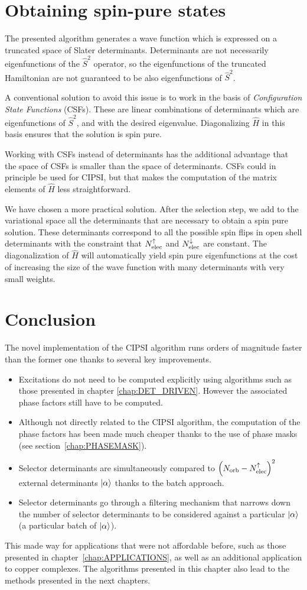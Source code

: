 \documentclass[./thesis.tex]{subfiles}
\begin{document}
\section{Obtaining spin-pure states}
\label{sec:cipsi_s2}

The presented algorithm generates a wave function which is expressed on a truncated space of Slater determinants. Determinants are not necessarily eigenfunctions of the $\widehat S^2$ operator, so the eigenfunctions of the truncated Hamiltonian are not guaranteed to be also eigenfunctions of $\widehat S^2$.

A conventional solution to avoid this issue is to work in the basis of \emph{Configuration State Functions} (CSFs). These are linear combinations of determinants which are eigenfunctions of $\widehat S^2$, and with the desired eigenvalue. Diagonalizing $\widehat H$ in this basis ensures that the solution is spin pure.

Working with CSFs instead of determinants has the additional advantage that the space of CSFs is smaller than the space of determinants. CSFs could in principle be used for CIPSI, but that makes the computation of the matrix elements of $\widehat H$ less straightforward.

We have chosen a more practical solution.\cite{Bytautas_2009} After the selection step, we add to the variational space all the determinants that are necessary to obtain a spin pure solution. These determinants correspond to all the possible spin flips in open shell determinants with the constraint that ${N_\text{elec}^{\uparrow}}$ and ${N_\text{elec}^{\downarrow}}$ are constant. The diagonalization of $\widehat H$ will automatically yield spin pure eigenfunctions at the cost of increasing the size of the wave function with many determinants with very small weights.

\section{Conclusion}

The novel implementation of the CIPSI algorithm runs orders of magnitude faster than the former one thanks to several key improvements.
\begin{itemize}
\item
Excitations do not need to be computed explicitly using algorithms such as those presented in chapter \ref{chap:DET_DRIVEN}. However the associated phase factors still have to be computed.
\item
Although not directly related to the CIPSI algorithm, the computation of the phase factors has been made much cheaper thanks to the use of phase masks (see section~\ref{chap:PHASEMASK}).
\item
Selector determinants are simultaneously compared to $\qty({N_\text{orb}}-{N_\text{elec}^{\uparrow}})^2$ external determinants ${\ket{\alpha}}$ thanks to the batch approach.
\item
Selector determinants go through a filtering mechanism that narrows down the number of selector determinants to be considered against a particular ${\ket{\alpha}}$ (a particular batch of ${\ket{\alpha}}$).
\end{itemize}

This made way for applications that were not affordable before, such as those presented in chapter~\ref{chap:APPLICATIONS}, as well as an additional application to copper complexes.\cite{1806.05115}
The algorithms presented in this chapter also lead to the methods presented in the next chapters.
\end{document}
